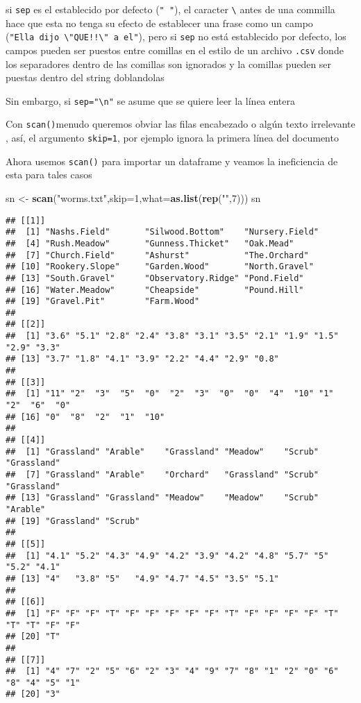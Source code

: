 \documentclass[]{article}
\newenvironment{Shaded}{\begin{snugshade}}{\end{snugshade}}
\newcommand{\KeywordTok}[1]{\textcolor[rgb]{0.13,0.29,0.53}{\textbf{#1}}}
\newcommand{\DataTypeTok}[1]{\textcolor[rgb]{0.13,0.29,0.53}{#1}}
\newcommand{\DecValTok}[1]{\textcolor[rgb]{0.00,0.00,0.81}{#1}}
\newcommand{\StringTok}[1]{\textcolor[rgb]{0.31,0.60,0.02}{#1}}
\newcommand{\NormalTok}[1]{#1}
\begin{document}
si \texttt{sep} es el establecido por defecto (\texttt{"\ "}), el
caracter \texttt{\textbackslash{}} antes de una commilla hace que esta
no tenga su efecto de establecer una frase como un campo
(\texttt{"Ella\ dijo\ \textbackslash{}"QUE!!\textbackslash{}"\ a\ el"}),
pero si \texttt{sep} no está establecido por defecto, los campos pueden
ser puestos entre comillas en el estilo de un archivo \texttt{.csv}
donde los separadores dentro de las comillas son ignorados y la comillas
pueden ser puestas dentro del string doblandolas

Sin embargo, si \texttt{sep="\textbackslash{}n"} se asume que se quiere
leer la línea entera

Con \texttt{scan()}menudo queremos obviar las filas encabezado o algún
texto irrelevante , así, el argumento \texttt{skip=1}, por ejemplo
ignora la primera línea del documento

Ahora usemos \texttt{scan()} para importar un dataframe y veamos la
ineficiencia de esta para tales casos

\begin{Shaded}
\begin{Highlighting}[]
\NormalTok{sn <-}\StringTok{ }\KeywordTok{scan}\NormalTok{(}\StringTok{"worms.txt"}\NormalTok{,}\DataTypeTok{skip=}\DecValTok{1}\NormalTok{,}\DataTypeTok{what=}\KeywordTok{as.list}\NormalTok{(}\KeywordTok{rep}\NormalTok{(}\StringTok{""}\NormalTok{,}\DecValTok{7}\NormalTok{)))}
\NormalTok{sn}
\end{Highlighting}
\end{Shaded}

\begin{verbatim}
## [[1]]
##  [1] "Nashs.Field"       "Silwood.Bottom"    "Nursery.Field"    
##  [4] "Rush.Meadow"       "Gunness.Thicket"   "Oak.Mead"         
##  [7] "Church.Field"      "Ashurst"           "The.Orchard"      
## [10] "Rookery.Slope"     "Garden.Wood"       "North.Gravel"     
## [13] "South.Gravel"      "Observatory.Ridge" "Pond.Field"       
## [16] "Water.Meadow"      "Cheapside"         "Pound.Hill"       
## [19] "Gravel.Pit"        "Farm.Wood"        
## 
## [[2]]
##  [1] "3.6" "5.1" "2.8" "2.4" "3.8" "3.1" "3.5" "2.1" "1.9" "1.5" "2.9" "3.3"
## [13] "3.7" "1.8" "4.1" "3.9" "2.2" "4.4" "2.9" "0.8"
## 
## [[3]]
##  [1] "11" "2"  "3"  "5"  "0"  "2"  "3"  "0"  "0"  "4"  "10" "1"  "2"  "6"  "0" 
## [16] "0"  "8"  "2"  "1"  "10"
## 
## [[4]]
##  [1] "Grassland" "Arable"    "Grassland" "Meadow"    "Scrub"     "Grassland"
##  [7] "Grassland" "Arable"    "Orchard"   "Grassland" "Scrub"     "Grassland"
## [13] "Grassland" "Grassland" "Meadow"    "Meadow"    "Scrub"     "Arable"   
## [19] "Grassland" "Scrub"    
## 
## [[5]]
##  [1] "4.1" "5.2" "4.3" "4.9" "4.2" "3.9" "4.2" "4.8" "5.7" "5"   "5.2" "4.1"
## [13] "4"   "3.8" "5"   "4.9" "4.7" "4.5" "3.5" "5.1"
## 
## [[6]]
##  [1] "F" "F" "F" "T" "F" "F" "F" "F" "F" "T" "F" "F" "F" "F" "T" "T" "T" "F" "F"
## [20] "T"
## 
## [[7]]
##  [1] "4" "7" "2" "5" "6" "2" "3" "4" "9" "7" "8" "1" "2" "0" "6" "8" "4" "5" "1"
## [20] "3"
\end{verbatim}
\end{document}

